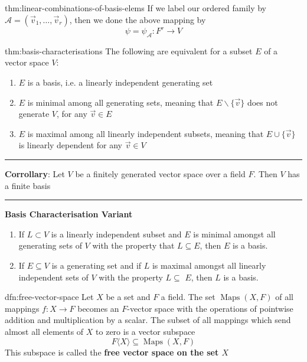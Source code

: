 \documentclass[landscape, 8pt]{extarticle}
\DeclareMathOperator{\Maps}{Maps}
\begin{document}
\begin{multicols}{3}
\begin{thm}{thm:linear-combinations-of-basis-elems}{}
    If we label our ordered family by $\mathcal{A} = (\vec{v}_{1},\dots,\vec{v}_{r})$, then we done the above mapping by
    \[\psi = \psi_{\mathcal{A}} : F^{r}\to V\]
\end{thm}

\vspace{-5pt}
\begin{thm}{thm:basis-characterisations}{}
    The following are equivalent for a subset $E$ of a vector space $V$:
    \vspace{-5pt}
    \begin{enumerate}
        \setlength\itemsep{0em}
        \item $E$ is a basis, i.e. a linearly independent generating set
        \item $E$ is minimal among all generating sets, meaning that $E \backslash \{\vec{v}\}$ does not generate $V$, for any $\vec{v}\in E$
        \item $E$ is maximal among all linearly independent subsets, meaning that $E \cup \{\vec{v}\}$ is linearly dependent for any $\vec{v}\in V$
    \end{enumerate}

    \vspace{-10pt}
    \noindent\rule{\textwidth}{0.2pt}
    \textbf{Corrollary}: Let $V$ be a finitely generated vector space over a field $F$. Then $V$ has a finite basis

    \noindent\rule{\textwidth}{0.2pt}
    \textbf{Basis Characterisation Variant}
    \vspace{-5pt}
    \begin{enumerate}
        \setlength\itemsep{0em}
        \item If $L \subset V$ is a linearly independent subset and $E$ is minimal amongst all generating sets of $V$ with the property that $L \subseteq E$, then $E$ is a basis.
        \item If $E \subseteq V$ is a generating set and if $L$ is maximal amongst all linearly independent sets of $V$ with the property $L \subseteq$ $E$, then $L$ is a basis.
    \end{enumerate}
\end{thm}

\vspace{-5pt}
\begin{dfn}{dfn:free-vector-space}{}
    Let $X$ be a set and $F$ a field. The set $\Maps(X, F)$ of all mappings $f: X \to F $ becomes an $F$-vector space with the operations of pointwise addition and multiplication by a scalar. The subset of all mappings which send almost all elements of $X$ to zero is a vector subspace
    \[F\langle X \rangle \subseteq \Maps(X, F)\]
    This subspace is called the \textbf{free vector space on the set $X$}
\end{dfn}


\end{multicols}
\end{document}
